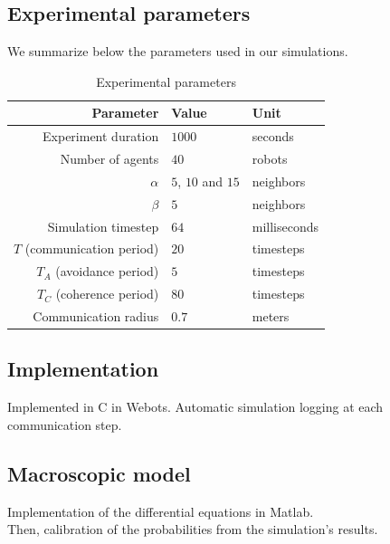 \documentclass[a4paper, 10pt, conference]{ieeeconf}
\begin{document}
  \subsection{Experimental parameters}
  We summarize below the parameters used in our simulations.

  \begin{table}[h]
    \begin{center}
      \begin{tabular}{r|ll}
        \hline
        Parameter                  & Value               & Unit\\
        \hline
        Experiment duration        & $1000$              & seconds\\
        Number of agents           & $40$                & robots\\
        $\alpha$                   & $5$, $10$ and $15$  & neighbors\\
        $\beta$                    & $5$                 & neighbors\\
        Simulation timestep        & $64$                & milliseconds\\
        $T$ (communication period) & $20$                & timesteps\\
        $T_A$ (avoidance period)   & $5$                 & timesteps\\
        $T_C$ (coherence period)   & $80$                & timesteps\\
        Communication radius       & $0.7$               & meters\\
        \hline
      \end{tabular}
      \caption{Experimental parameters}
    \end{center}
  \end{table}

  \subsection{Implementation}
  Implemented in C in Webots. Automatic simulation logging at each communication step.\\

  \subsection{Macroscopic model}
  Implementation of the differential equations in Matlab.\\
  Then, calibration of the probabilities from the simulation's results.
\end{document}
